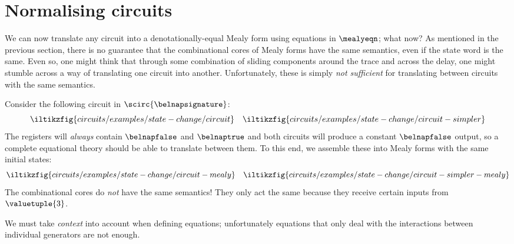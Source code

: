 \section{Normalising circuits}

We can now translate any circuit into a denotationally-equal Mealy form using
equations in \(\mealyeqn\); what now?
As mentioned in the previous section, there is no guarantee that the
combinational cores of Mealy forms have the same semantics, even if the state
word is the same.
Even so, one might think that through some combination of sliding components
around the trace and across the delay, one might stumble across a way of
translating one circuit into another.
Unfortunately, these is simply \emph{not sufficient} for
translating between circuits with the same semantics.

\begin{example}
    Consider the following circuit in \(\scirc{\belnapsignature}\): \[
        \iltikzfig{circuits/examples/state-change/circuit}
        \quad
        \iltikzfig{circuits/examples/state-change/circuit-simpler}
    \]
    The registers will \emph{always} contain
    \(\belnapfalse\) and \(\belnaptrue\) and both circuits will
    produce a constant \(\belnapfalse\) output, so a complete equational theory
    should be able to translate between them.
    To this end, we assemble these into Mealy forms with the same initial states:
    \[
        \iltikzfig{circuits/examples/state-change/circuit-mealy}
        \quad
        \iltikzfig{circuits/examples/state-change/circuit-simpler-mealy}
    \]
    The combinational cores do \emph{not} have the same semantics!
    They only act the same because they receive certain inputs
    from \(\valuetuple{3}\).
\end{example}

We must take \emph{context} into account when defining
equations; unfortunately equations that only deal with the interactions between
individual generators are not enough.

